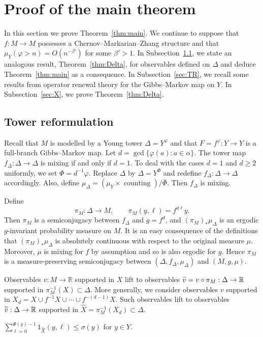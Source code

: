 \documentclass[AHL,Unicode,longabstracts,published]{cedram}
\newcommand{\R}{\mathbb{R}}
\DeclareMathOperator{\counting}{counting}
\newcommand{\hX}{\widehat{X}}
\newcommand{\tv}{\tilde{v}}
\newcommand{\bPhi}{\bar{\Phi}}
\let\oldtilde\tilde
\renewcommand*{\tilde}[1]{\mathchoice{\widetilde{#1}}{\widetilde{#1}}{\oldtilde{#1}}{\oldtilde{#1}}}
\begin{document}
\section{Proof of the main theorem}\label{sec:proof}

In this section we prove Theorem~\ref{thm:main}. We continue to suppose that $f:M\to M$ possesses a Chernov--Markarian--Zhang structure and that $\mu_Y(\varphi>n)=O(n^{-\beta'})$ for some $\beta'>1$. In Subsection~\ref{sec:Delta}, we state an analogous result, Theorem~\ref{thm:Delta}, for observables defined on $\Delta$ and deduce Theorem~\ref{thm:main} as a consequence. In Subsection~\ref{sec:TR}, we recall some results from operator renewal theory for the Gibbs--Markov map on $Y$. In Subsection~\ref{sec:X}, we prove Theorem~\ref{thm:Delta}.

\subsection{Tower reformulation}\label{sec:Delta}

Recall that $M$ is modelled by a Young tower $\Delta=Y^\varphi$ and that $F=f^\varphi:Y\to Y$ is a full-branch Gibbs--Markov map. Let $d=\gcd\{\varphi(a):a\in\alpha\}$. The tower map $f_\Delta:\Delta\to\Delta$ is mixing if and only if $d=1$. To deal with the cases $d=1$ and $d\ge2$ uniformly, we set $\Phi=d^{-1}\varphi$. Replace $\Delta$ by $\Delta=Y^\Phi$ and redefine $f_\Delta:\Delta\to\Delta$ accordingly. Also, define $\mu_\Delta=(\mu_Y\times\counting)/\bPhi$. Then $f_\Delta$ is mixing.

Define
\[
\pi_M:\Delta\to M, \qquad \pi_M(y,\ell)=f^{d\ell}y.
\]
Then $\pi_M$ is a semiconjugacy between $f_\Delta$ and $g=f^d$, and $(\pi_M)_*\mu_\Delta$ is an ergodic $g$-invariant probability measure on $M$. It is an easy consequence of the definitions that $(\pi_M)_*\mu_\Delta$ is absolutely continuous with respect to the original measure $\mu$. Moreover, $\mu$ is mixing for $f$ by assumption and so is also ergodic for $g$. Hence $\pi_M$ is a measure-preserving semiconjugacy between $(\Delta,f_\Delta,\mu_\Delta)$ and $(M,g,\mu)$.

Observables $v:M\to\R$ supported in $X$ lift to observables $\tv=v\circ \pi_M:\Delta\to\R$ supported in $\pi_M^{-1}(X)\subset\Delta$. More generally, we consider observables $v$ supported in $X_d=X\cup f^{-1}X\cup\cdots\cup f^{-(d-1)}X$. Such observables lift to observables $\tv:\Delta\to\R$ supported in $\hX=\pi_M^{-1}(X_d)\subset\Delta$.

\begin{prop}\label{prop:hX}
$\sum_{\ell=0}^{\Phi(y)-1}1_{\hX}(y,\ell) \le \sigma(y)$ for $y\in Y$.
\end{prop}
\end{document}
